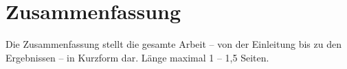 \chapter{Zusammenfassung} \label{cha:summary}

Die Zusammenfassung stellt die gesamte Arbeit -- von der Einleitung bis zu den Ergebnissen -- in Kurzform dar. Länge maximal 1 -- 1,5 Seiten.
\clearpage
